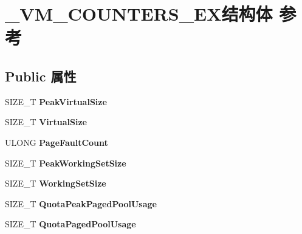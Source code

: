 \hypertarget{struct___v_m___c_o_u_n_t_e_r_s___e_x}{}\section{\+\_\+\+V\+M\+\_\+\+C\+O\+U\+N\+T\+E\+R\+S\+\_\+\+E\+X结构体 参考}
\label{struct___v_m___c_o_u_n_t_e_r_s___e_x}
\subsection*{Public 属性}
\begin{DoxyCompactItemize}
\item 
\mbox{\label{struct___v_m___c_o_u_n_t_e_r_s___e_x_a03da92a827febe74dbf3c4066c0ced56}} 
S\+I\+Z\+E\+\_\+T {\bfseries Peak\+Virtual\+Size}
\item 
\mbox{\label{struct___v_m___c_o_u_n_t_e_r_s___e_x_a2ea5ce9bf778ff0c7128a106137f6616}} 
S\+I\+Z\+E\+\_\+T {\bfseries Virtual\+Size}
\item 
\mbox{\label{struct___v_m___c_o_u_n_t_e_r_s___e_x_aa052b316b18198b6dd9812ec91d757e6}} 
U\+L\+O\+NG {\bfseries Page\+Fault\+Count}
\item 
\mbox{\label{struct___v_m___c_o_u_n_t_e_r_s___e_x_a2ecd97560b3ab624659b094012bcb53b}} 
S\+I\+Z\+E\+\_\+T {\bfseries Peak\+Working\+Set\+Size}
\item 
\mbox{\label{struct___v_m___c_o_u_n_t_e_r_s___e_x_a241147db608b2cf61dd05c2563cfd08e}} 
S\+I\+Z\+E\+\_\+T {\bfseries Working\+Set\+Size}
\item 
\mbox{\label{struct___v_m___c_o_u_n_t_e_r_s___e_x_a55557cc927b6f8e5df352ede51f5f96f}} 
S\+I\+Z\+E\+\_\+T {\bfseries Quota\+Peak\+Paged\+Pool\+Usage}
\item 
\mbox{\label{struct___v_m___c_o_u_n_t_e_r_s___e_x_a7daf808ba3f89065649ca613e61bb4e8}} 
S\+I\+Z\+E\+\_\+T {\bfseries Quota\+Paged\+Pool\+Usage}
\item 

\end{DoxyCompactItemize}
